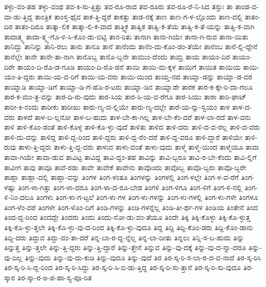 {ತಳ್ಳು-ವಂ-ತಹ
ತಳ್ಳು-ವಂಥ
ತವ-ಕಿ-ಸು-ತ್ತಿತ್ತು
ತವ-ರೂ-ರಾದ
ತವ-ರೂರು
ತವ-ರೂ-ರೆ-ನಿ-ಸಿದ
ತಸ್ತುಃ
ತಾ
ತಾಂಡ-ವ-ವಾ-ಡು-ತ್ತಿದ್ದ
ತಾಂತ್ರಿಕ
ತಾಂಸ್ತ-ಥೈವ
ತಾಕ-ತ್ತಿ-ದ್ದರೆ
ತಾಕತ್ತು
ತಾಡ-ನಕ್ಕೆ
ತಾಣ
ತಾಣ-ಗ-ಳ-ಲ್ಲೊಂದು
ತಾಣ-ದಲ್ಲಿ
ತಾತಂ-ದಿರ
ತಾತಂ-ದಿರೂ
ತಾತ್ಕಾ-ಲಿಕ
ತಾತ್ಕಾ-ಲಿ-ಕ-ವಾದ
ತಾತ್ತ್ವಿಕ
ತಾತ್ವಿಕ
ತಾತ್ವಿ-ಕ-ತೆಯ
ತಾತ್ವಿ-ಕ-ತೆ-ಯನ್ನು
ತಾತ್ವಿ-ಕ-ವಾಗಿ
ತಾದಾತ್ಮ್ಯ
ತಾದಾ-ತ್ಮ್ಯ-ಗೊ-ಳಿ-ಸಿ-ಕೊಂ-ಡು-ಬಿಟ್ಟಿ
ತಾನ-ರಿತು
ತಾನಾಗಿ
ತಾನಾ-ಗಿಯೇ
ತಾನಾ-ಗಿ-ರುವ
ತಾನಾ-ಯಿತು
ತಾನಿದ್ದು
ತಾನಿನ್ನು
ತಾನಿ-ರಲು
ತಾನು
ತಾನೂ
ತಾನೆ
ತಾನೆಂದು
ತಾನೆಂ-ದು-ಕೊಂ-ಡಂ-ತೆಯೇ
ತಾನೆಂಬ
ತಾನೆ-ಲ್ಲಿ-ದ್ದೇನೆ
ತಾನೆಲ್ಲೇ
ತಾನೇ
ತಾನೇ-ತಾ-ನಾಗಿ
ತಾನೊಬ್ಬ
ತಾನೊ-ಬ್ಬನೇ
ತಾಮುಂ-ದೆಂದು
ತಾಮ್ರ
ತಾಯ
ತಾಯಂ-ದಿರ
ತಾಯಂ-ದಿರೇ
ತಾಯಂ-ದಿ-ರೊ-ಡ-ಗೂಡಿ
ತಾಯಂ-ದಿ-ರೊ-ಡನೆ
ತಾಯಿ
ತಾಯಿ-ಮ-ಕ್ಕಳ
ತಾಯಿಗೆ
ತಾಯಿತ
ತಾಯಿಯ
ತಾಯಿ-ಯಂ-ತಿ-ದ್ದರು
ತಾಯಿ-ಯ-ವ-ರಿಗೆ
ತಾಯಿ-ಯ-ವರು
ತಾಯಿ-ಯಿಂದ
ತಾಯ್ತ-ನದ
ತಾಯ್ನಾ-ಡನ್ನು
ತಾಯ್ನಾ-ಡ-ವರ
ತಾಯ್ನಾಡಿ
ತಾಯ್ನಾ-ಡಿಗೆ
ತಾಯ್ನಾ-ಡಿ-ಗೆ-ಹೊ-ರ-ಟರು
ತಾಯ್ನಾ-ಡಿನ
ತಾಯ್ನಾಡೇ
ತಾರಕ
ತಾರ-ಕ-ಕ್ಕೇ-ರಿ-ದಾ-ಗಲೂ
ತಾರ-ಕ-ಮಂ-ತ್ರ-ವನ್ನು
ತಾರ-ದಿ-ರು-ವುದು
ತಾರ-ಸಿಯ
ತಾರ-ಸಿ-ಯ-ವ-ರೆಗೂ
ತಾರ-ಸಿಯು
ತಾರಾ
ತಾರಿ-ಘಾಟ್
ತಾರೀ-ಕಿ-ನಂದು
ತಾರೀಕು
ತಾರೀಖು
ತಾರು-ಣ್ಯ-ದ-ಲ್ಲಿಯೇ
ತಾರು-ಣ್ಯ-ದಲ್ಲೇ
ತಾರೆ-ಯ-ನ್ನು-ಸ್ವಯಂ
ತಾಳ
ತಾಳ-ದ-ವರು
ತಾಳದೆ
ತಾಳ-ಬ-ಲ್ಲನೋ
ತಾಳ-ಬ-ಹುದು
ತಾಳ-ಬೇ-ಕಾ-ಗಿಲ್ಲ
ತಾಳ-ಬೇ-ಕೆಂ-ದರೆ
ತಾಳ-ಲಾ-ರದೆ
ತಾಳ-ವನು
ತಾಳಿ
ತಾಳಿ-ಕೊಂ-ಡಂತೆ
ತಾಳಿ-ಕೊಳ್ಳ
ತಾಳಿ-ಕೊ-ಳ್ಳು-ವುದೆ
ತಾಳಿತು
ತಾಳಿದ
ತಾಳಿ-ದರು
ತಾಳಿ-ದ-ವ-ರಲ್ಲ
ತಾಳಿ-ದ-ವರು
ತಾಳಿ-ದು-ದನ್ನು
ತಾಳಿದ್ದ
ತಾಳಿ-ದ್ದ-ರಿಂದ
ತಾಳಿ-ದ್ದರು
ತಾಳಿ-ದ್ದ-ರೆಂ-ದರೆ
ತಾಳಿ-ದ್ದ-ವರೂ
ತಾಳಿ-ದ್ದಾರೆ
ತಾಳಿಯೇ
ತಾಳಿ-ರುವು
ತಾಳು-ತ್ತಿ-ದ್ದರು
ತಾಳು-ತ್ತಿ-ದ್ದ-ವರು
ತಾಳುವ
ತಾಳು-ವಂತೆ
ತಾಳು-ವುದು
ತಾಳ್ಮೆ
ತಾಳ್ಮೆ-ಯಿಂದ
ತಾಳ್ಮೆಯೂ
ತಾವಾ
ತಾವಾ-ಗಿಯೇ
ತಾವಾ-ಡುವ
ತಾವಿಟ್ಟ
ತಾವಿದ್ದ
ತಾವಿ-ದ್ದಂ-ತಹ
ತಾವಿನ್ನು
ತಾವಿ-ಬ್ಬರೂ
ತಾವಿ-ರ-ಬೇ-ಕೆಂದು
ತಾವಿ-ಲ್ಲಿಗೆ
ತಾವೀಗ
ತಾವು
ತಾವೂ
ತಾವೆ-ರಡು
ತಾವೇ
ತಾವೇಕೆ
ತಾವೇನು
ತಾವೊಂದು
ತಾವೊಬ್ಬ
ತಾವೊ-ಬ್ಬರು
ತಾವೊ-ಬ್ಬರೇ
ತಾಹ್ಲಾ
ತಾಹ್ಲಾ-ದಲ್ಲಿ
ತಾಹ್ಲಾ-ವನ್ನು
ತಿಂಗಳ
ತಿಂಗ-ಳಂತೂ
ತಿಂಗಳನ್ನು
ತಿಂಗಳಲ್ಲಿ
ತಿಂಗ-ಳಲ್ಲೇ
ತಿಂಗ-ಳ-ವ-ರೆಗೆ
ತಿಂಗ-ಳಷ್ಟು
ತಿಂಗ-ಳಾ-ಗಿತ್ತು
ತಿಂಗ-ಳಾ-ದರೂ
ತಿಂಗ-ಳಾ-ದ-ರೂ-ಬೇಡ
ತಿಂಗಳಿ
ತಿಂಗ-ಳಿಗೂ
ತಿಂಗ-ಳಿಗೆ
ತಿಂಗ-ಳಿ-ನಲ್ಲಿ
ತಿಂಗ-ಳಿ-ನಿಂ-ದಲೂ
ತಿಂಗಳು
ತಿಂಗ-ಳು-ಗ-ಟ್ಟಲೆ
ತಿಂಗ-ಳು-ಗಳ
ತಿಂಗ-ಳು-ಗಳನ್ನು
ತಿಂಗ-ಳು-ಗಳಲ್ಲಿ
ತಿಂಗ-ಳು-ಗಳೇ
ತಿಂಗಳೂ
ತಿಂಗ-ಳೆಂ-ದರೆ
ತಿಂಗಳೇ
ತಿಂಗ-ಳೊಂ-ದಿಗೆ
ತಿಂಡಿ-ಗಳನ್ನು
ತಿಂಡಿ-ಗಳನ್ನೆಲ್ಲ
ತಿಂಡಿ-ತೀ-ರ್ಥ-ಗಳ
ತಿಂಡಿಯ
ತಿಂತೇನೆ
ತಿಂದ
ತಿಂದ-ದ್ದ-ರಿಂದ
ತಿಂದದ್ದೇ
ತಿಂದರು
ತಿಂದು
ತಿಂದು-ನೋ-ಡು-ವಂ-ತೆಯೂ
ತಿಂದೇ
ತಿಕ್ಕಿ
ತಿಕ್ಕಿ-ಕೊಳ್ಳು
ತಿಕ್ಕಿ-ಕೊ-ಳ್ಳುತ್ತ
ತಿಕ್ಕಿ-ಕೊ-ಳ್ಳು-ತ್ತಲೇ
ತಿಕ್ಕಿ-ಕೊ-ಳ್ಳು-ವು-ದ-ರಿಂದ
ತಿಕ್ಕಿ-ಕೊ-ಳ್ಳು-ವುದೂ
ತಿದ್ದ
ತಿದ್ದಿ
ತಿದ್ದಿ-ಕೊಂ-ಡರು
ತಿದ್ದಿ-ಕೊಂ-ಡಾನು
ತಿದ್ದಿ-ದರು
ತಿದ್ದುವ
ತಿದ್ದು-ವಂ-ತಾ-ದರೆ
ತಿನ್ನ-ಬಾ-ರ-ದ್ದ-ನ್ನೆಲ್ಲ
ತಿನ್ನ-ಲಾ-ದೀತು
ತಿನ್ನಲು
ತಿನ್ನಿ-ಸ-ಬ-ಹುದು
ತಿನ್ನು
ತಿನ್ನುತ್ತ
ತಿನ್ನು-ತ್ತಲೇ
ತಿನ್ನು-ತ್ತಿ-ದ್ದರು
ತಿನ್ನು-ತ್ತಿ-ದ್ದಾರೆ
ತಿನ್ನು-ತ್ತೇನೆ
ತಿನ್ನುವ
ತಿನ್ನು-ವು-ದಕ್ಕೆ
ತಿನ್ನು-ವು-ದ-ನ್ನಾ-ದರೂ
ತಿನ್ನು-ವು-ದಿಲ್ಲ
ತಿನ್ನು-ವುದು
ತಿನ್ನು-ವು-ದು-ಕುಡಿ
ತಿನ್ನು-ವುದೂ
ತಿನ್ನು-ವುದೆ
ತಿರ
ತಿರ-ಸ್ಕ-ರಿ-ಸ-ಲಾ-ರ-ದ-ವ-ನಾದೆ
ತಿರ-ಸ್ಕ-ರಿಸಿ
ತಿರ-ಸ್ಕ-ರಿ-ಸಿ-ದ್ದ-ರಿಂದ
ತಿರ-ಸ್ಕ-ರಿ-ಸಿದ್ದು
ತಿರ-ಸ್ಕ-ರಿ-ಸಿ-ಬಿ-ಡು-ತ್ತಿದ್ದ
ತಿರ-ಸ್ಕ-ರಿ-ಸು-ತ್ತಾನೆ
ತಿರ-ಸ್ಕ-ರಿ-ಸು-ವುದೂ
ತಿರ-ಸ್ಕಾರ
ತಿರ-ಸ್ಕಾ-ರ-ಅ-ಪ-ಹಾ-ಸ್ಯ-ಪೂ-ರಿತ
}
